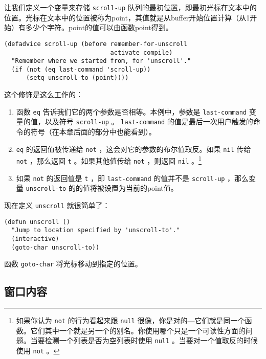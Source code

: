 让我们定义一个变量来存储 \texttt{scroll-up} 队列的最初位置，即最初光标在文本中的位置。光标在文本中的位置被称为point，其值就是从buffer开始位置计算（从1开始）有多少个字符。point的值可以由函数point得到。

\begin{verbatim}
(defadvice scroll-up (before remember-for-unscroll
                             activate compile)
  "Remember where we started from, for 'unscroll'."
  (if (not (eq last-command 'scroll-up))
      (setq unscroll-to (point))))
\end{verbatim}

这个修饰是这么工作的：

\begin{enumerate}
  \item 函数 \texttt{eq} 告诉我们它的两个参数是否相等。本例中，参数是 \texttt{last-command} 变量的值，以及符号 \texttt{scroll-up} 。 \texttt{last-command} 的值是最后一次用户触发的命令的符号（在本章后面的部分中也能看到）。
  \item \texttt{eq} 的返回值被传递给 \texttt{not} ，这会对它的参数的布尔值取反。如果 \texttt{nil} 传给 \texttt{not} ，那么返回 \texttt{t} 。如果其他值传给 \texttt{not} ，则返回 \texttt{nil} 。\footnote{如果你认为 \texttt{not} 的行为看起来跟 \texttt{null} 很像，你是对的---它们就是同一个函数。它们其中一个就是另一个的别名。你使用哪个只是一个可读性方面的问题。当要检测一个列表是否为空列表时使用 \texttt{null} 。当要对一个值取反的时候使用 \texttt{not} 。}
  \item 如果 \texttt{not} 的返回值是 \texttt{t} ，即 \texttt{last-command} 的值并不是 \texttt{scroll-up} ，那么变量 \texttt{unscroll-to} 的的值将被设置为当前的point值。
\end{enumerate}

现在定义 \texttt{unscroll} 就很简单了：

\begin{verbatim}
(defun unscroll ()
  "Jump to location specified by 'unscroll-to'."
  (interactive)
  (goto-char unscroll-to))
\end{verbatim}

函数 \texttt{goto-char} 将光标移动到指定的位置。

\subsection{窗口内容}
\label{section:03-Window-Appearance}

